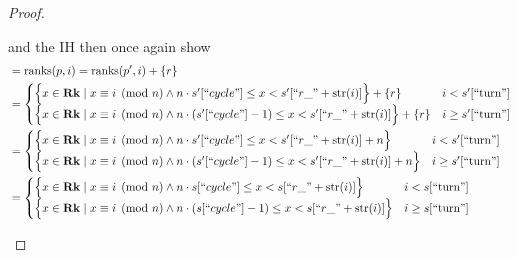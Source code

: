\documentclass{amsart}
\DeclareMathOperator{\Rk}{\mathbf{Rk}}
\DeclareMathOperator{\ranks}{\mathrm{ranks}}
\theoremstyle{definition}
\begin{document}
\begin{proof}
\begin{enumerate}
\begin{enumerate}
                     and the IH then once again show
                    \begin{align*}
                        &= \ranks(p, i) = \ranks(p^\prime, i) + \{r\}\\
                        &=
                            \begin{cases}
                                \Big\{x \in \Rk \mid x \equiv i \pmod n \land n \cdot s^\prime[``cycle"] \leq x < s^\prime[``r\_" + \mathrm{str}(i)] \Big\} + \{r\}
                                & i < s^\prime[``\text{turn}"]\\
                                \Big\{x \in \Rk \mid x \equiv i \pmod n \land n \cdot (s^\prime[``cycle"] - 1) \leq x < s^\prime[``r\_" + \mathrm{str}(i)]\Big\} + \{r\}
                                & i \geq s^\prime[``\text{turn}"]
                            \end{cases}\\
                        &=
                            \begin{cases}
                                \Big\{x \in \Rk \mid x \equiv i \pmod n \land n \cdot s^\prime[``cycle"] \leq x < s^\prime[``r\_" + \mathrm{str}(i)] + n\Big\}
                                & i < s^\prime[``\text{turn}"]\\
                                \Big\{x \in \Rk \mid x \equiv i \pmod n \land n \cdot (s^\prime[``cycle"] - 1) \leq x < s^\prime[``r\_" + \mathrm{str}(i)] + n\Big\}
                                & i \geq s^\prime[``\text{turn}"]
                            \end{cases}\\
                        &=
                            \begin{cases}
                                \Big\{x \in \Rk \mid x \equiv i \pmod n \land n \cdot s[``cycle"] \leq x < s[``r\_" + \mathrm{str}(i)] \Big\}
                                & i < s[``\text{turn}"]\\
                                \Big\{x \in \Rk \mid x \equiv i \pmod n \land n \cdot (s[``cycle"] - 1) \leq x < s[``r\_" + \mathrm{str}(i)]\Big\}
                                & i \geq s[``\text{turn}"]
                            \end{cases}
                    \end{align*}


\end{enumerate}
\end{enumerate}
\end{proof}
\end{document}
